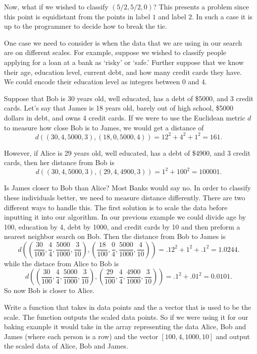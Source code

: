 Now, what if we wished to classify $(5/2,5/2,0)$?  
This presents a problem since this point is equidistant from the points in label $1$ and label $2$.  
In such a case it is up to the programmer to decide how to break the tie.

One case we need to consider is when the data that we are using in our search are on different scales. 
For example, suppose we wished to classify people applying for a loan at a bank as `risky' or `safe.'  
Further suppose that we know their age, education level, current debt, and how many credit cards they have.  
We could encode their education level as integers between $0$ and $4$.

Suppose that Bob is 30 years old, well educated, has a debt of \$5000, and 3 credit cards.  
Let's say that James is 18 years old, barely out of high school, \$5000 dollars in debt, and owns 4 credit cards.  
If we were to use the Euclidean metric $d$ to measure how close Bob is to James, we would get a distance of
\[
d((30,4,5000,3),(18,0,5000,4)) = 12^2 + 4^2 + 1^2 = 161.
\]

However, if Alice is 29 years old, well educated, has a debt of \$4900, and 3 credit cards, then her distance from Bob is
\[
d((30,4,5000,3),(29,4,4900,3)) = 1^2 + 100^2 = 100001.
\]

Is James closer to Bob than Alice?  Most Banks would say no.  
In order to classify these individuals better, we need to measure distance differently. 
There are two different ways to handle this. 
The first solution is to scale the data before inputting it into our algorithm. 
In our previous example we could divide age by 100, education by 4, debt by 1000, and credit cards by 10 and then preform a nearest neighbor search on Bob. 
Then the distance from Bob to James is 
\[
d\left( \left( \frac{30}{100},\frac{4}{4},\frac{5000}{1000},\frac{3}{10} \right),\left(\frac{18}{100},\frac{0}{4},\frac{5000}{1000},\frac{4}{10}\right)\right) = .12^2 + 1^2 + .1^2 = 1.0244.
\]
while the distace from Alice to Bob is
\[
d\left(\left(\frac{30}{100},\frac{4}{4},\frac{5000}{1000},\frac{3}{10}\right),\left(\frac{29}{100},\frac{4}{4},\frac{4900}{1000},\frac{3}{10}\right)\right) = .1^2 + .01^2 = 0.0101.
\]
So now Bob is closer to Alice.

\begin{problem}
Write a function that takes in data points and the a vector that is used to be the scale. 
The function outputs the scaled data points. 
So if we were using it for our baking example it would take in the array representing the data Alice, Bob and James (where each person is a row) and the vector $[100,4,1000,10]$ and output the scaled data of Alice, Bob and James.
\end{problem}

